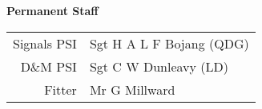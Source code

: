 \vspace*{5mm}

\begin{center}
  \Large
  \textbf{Permanent Staff}
\end{center}

\begin{center}
  \small
  \begin{tabular}{rl}
    Signals PSI & Sgt H A L F Bojang (QDG) \\
    D\&M PSI & Sgt C W Dunleavy (LD) \\
    Fitter & Mr G Millward \\
  \end{tabular}
\end{center}
